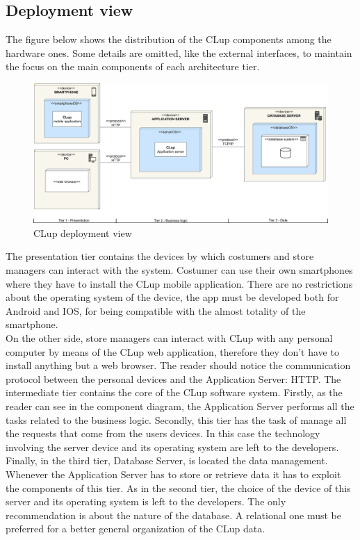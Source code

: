 \documentclass[]{article}
\begin{document}
		
	
	
	
	\newpage
	\subsection{Deployment view}
	The figure below shows the distribution of the CLup components among the hardware ones. Some details are omitted, like the external interfaces, to maintain the focus on the main components of each architecture tier. 
	\newline
	\begin{figure}[H]
		\centering
		\includegraphics[scale=0.38]{deployment}
		\caption{CLup deployment view}
		\label{fig:deployment}
	\end{figure}


	\bigskip
	\noindent	
	The presentation tier contains the devices by which costumers and store managers can interact with the system. Costumer can use their own smartphones where they have to install the CLup mobile application. There are no restrictions about the operating system of the device, the app must be developed both for Android and IOS, for being compatible with the almost totality of the smartphone. 
	\\On the other side, store managers can interact with CLup with any personal computer by means of the CLup web application, therefore they don't have to install anything but a web browser.
	The reader should notice the communication protocol between the personal devices and the Application Server: HTTP.
	\newline\newline
	The intermediate tier contains the core of the CLup software system. Firstly, as the reader can see in the component diagram, the Application Server performs all the tasks related to the business logic. 
	Secondly, this tier has the task of manage all the requests that come from the users devices. 
	In this case the technology involving the server device and its operating system are left to the developers.
	\newline\newline
	Finally, in the third tier, Database Server, is located the data management. Whenever the Application Server has to store or retrieve data it has to exploit the components of this tier. As in the second tier, the choice of the device of this server and its operating system is left to the developers. The only recommendation is about the nature of the database. A relational one must be preferred for a better general organization of the CLup data. 
	
\end{document}
